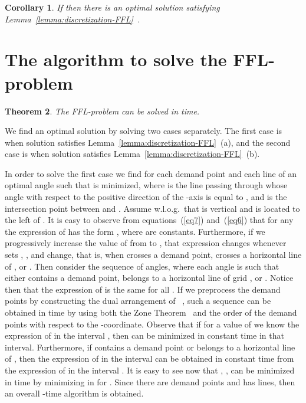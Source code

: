 \documentclass[11pt,a4paper,oneside,onecolumn]{article}
\newtheorem{theorem}{Theorem}[section]
\newtheorem{corollary}[theorem]{Corollary}
\def\QED{\ensuremath{{\square}}}
\def\markatright#1{\leavevmode\unskip\nobreak\quad\hspace*{\fill}{#1}}
\newenvironment{proof}
{\begin{trivlist}\item[\hskip\labelsep{\bf Proof.}]}
{\markatright{\QED}\end{trivlist}}
\begin{document}
\begin{corollary}\label{cor:discretization-FFL}
If  then there is an optimal solution
satisfying Lemma~\ref{lemma:discretization-FFL}~.
\end{corollary}



\section{The algorithm to solve the
FFL-problem}\label{section:algorithm-free}

\begin{theorem}\label{theorem:free/var/sum}
The FFL-problem can be solved in  time.
\end{theorem}
\begin{proof}
We find an optimal solution by solving two cases separately. The
first case is when solution satisfies
Lemma~\ref{lemma:discretization-FFL}~(a), and the second case is
when solution satisfies Lemma~\ref{lemma:discretization-FFL}~(b).

In order to solve the first case we find for each demand point 
and each line  of  an optimal angle  such that
 is minimized, where  is
the line passing through  whose angle with respect to the
positive direction of the -axis is equal to , and
 is the intersection point between  and
. Assume w.l.o.g.\ that  is vertical and  is
located to the left of . It is easy to observe from
equations~(\ref{eq7}) and~(\ref{eq6}) that for any  the
expression of  has the form
,
where  are constants. Furthermore, if we progressively
increase the value of  from  to , that
expression changes whenever sets , , and  change,
that is, when  crosses a demand point, 
crosses a horizontal line of , or . Then
consider the sequence
 of 
angles, where each angle   is such that
either  contains a demand point, 
belongs to a horizontal line of grid , or .
Notice then that the expression of  is
the same for all  .
If we preprocess the demand points  by constructing the dual
arrangement of ~\cite{o-rourke98}, such a sequence can be
obtained in  time by using both the Zone
Theorem~\cite{o-rourke98} and the order of the demand points with
respect to the -coordinate. Observe that if for a value of  we
know the expression of  in the interval
, then  can be
minimized in constant time in that interval. Furthermore, if
 contains a demand point or 
belongs to a horizontal line of , then the expression of
 in the interval
 can be obtained in constant time from
the expression of  in the interval
. It is easy to see now that
, , can
be minimized in  time by minimizing
 in  for
. Since there are  demand points and  has
 lines, then an overall -time algorithm is obtained.


\end{proof}
\end{document}

